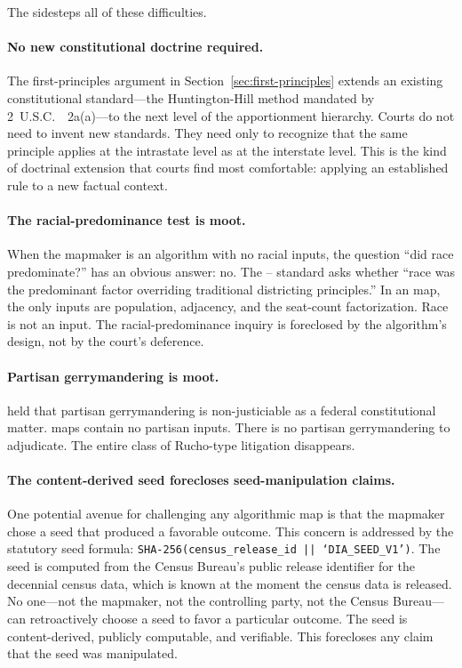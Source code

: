 The \dia{} sidesteps all of these difficulties.

\paragraph{No new constitutional doctrine required.}
The first-principles argument in Section~\ref{sec:first-principles} extends
an existing constitutional standard---the Huntington-Hill method mandated by
2~U.S.C.~\usca{}~2a(a)---to the next level of the apportionment hierarchy.
Courts do not need to invent new standards.
They need only to recognize that the same principle applies at the intrastate
level as at the interstate level.
This is the kind of doctrinal extension that courts find most comfortable:
applying an established rule to a new factual context.

\paragraph{The racial-predominance test is moot.}
When the mapmaker is an algorithm with no racial inputs, the question
``did race predominate?'' has an obvious answer: no.
The \shaw{}--\miller{} standard asks whether ``race was the predominant factor
overriding traditional districting principles.''
In an \ar{} map, the only inputs are population, adjacency, and the seat-count
factorization.
Race is not an input.
The racial-predominance inquiry is foreclosed by the algorithm's design,
not by the court's deference.

\paragraph{Partisan gerrymandering is moot.}
\rucho{} held that partisan gerrymandering is non-justiciable as a federal
constitutional matter.
\ar{} maps contain no partisan inputs.
There is no partisan gerrymandering to adjudicate.
The entire class of Rucho-type litigation disappears.

\paragraph{The content-derived seed forecloses seed-manipulation claims.}
One potential avenue for challenging any algorithmic map is that the
mapmaker chose a seed that produced a favorable outcome.
This concern is addressed by the statutory seed formula:
\texttt{SHA-256(census\_release\_id || `DIA\_SEED\_V1')}.
The seed is computed from the Census Bureau's public release identifier
for the decennial census data, which is known at the moment the census
data is released.
No one---not the mapmaker, not the controlling party, not the Census Bureau---
can retroactively choose a seed to favor a particular outcome.
The seed is content-derived, publicly computable, and verifiable.
This forecloses any claim that the seed was manipulated.

